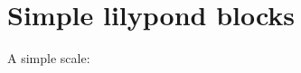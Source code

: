 \documentclass[a4paper, 12pt]{article}
\begin{document}
\section{Simple lilypond blocks}

A simple scale:

{%
\parindent 0pt
\noindent
\ifx\preLilyPondExample \undefined
\else
  \expandafter\preLilyPondExample
\fi
\def\lilypondbook{}%

\ifx\postLilyPondExample \undefined
\else
  \expandafter\postLilyPondExample
\fi
}
\end{document}
